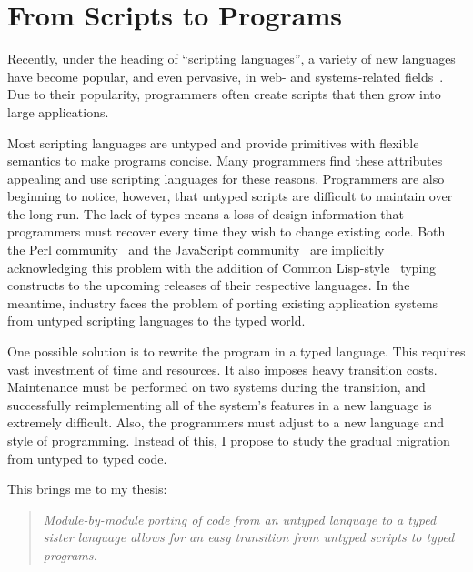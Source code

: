\chapter{From Scripts to Programs}
\label{chap:introduction}

Recently, under the heading of ``scripting languages'', a variety of
new languages have become popular, and even pervasive, in web- and
systems-related fields~\cite{ltm:php,ecma-std,ruby,tcltk,vd:python-ref-man,perl}.  Due to
their popularity, programmers often create scripts that then grow into
large applications.

Most scripting languages are untyped and provide primitives with
flexible semantics to make programs concise.  Many programmers find
these attributes appealing and use scripting languages for these
reasons.  Programmers are also beginning to notice, however, that
untyped scripts are difficult to maintain over the long run. The lack
of types means a loss of design information that programmers must
recover every time they wish to change existing code. Both the Perl
community~\citep{tang} and the JavaScript community~\citep{ecma-wiki,hf:js-ml} are
implicitly acknowledging this problem with the addition of Common
Lisp-style~\citep{cl2} typing constructs to the upcoming releases of
their respective languages.  In the meantime, industry faces the
problem of porting existing application systems from untyped scripting
languages to the typed world.


One possible solution is to rewrite the program in a typed language.
This requires vast investment of time and resources.  It also imposes
heavy transition costs.  Maintenance must be performed on two systems
during the transition, and successfully reimplementing all of the
system's features in 
a new language is extremely difficult.  Also, the programmers must
adjust to a new language and style of programming.  Instead of this,
I propose to study the gradual migration from untyped to typed code.

This brings me to my thesis:

\begin{quote}
{\it Module-by-module porting of code from an untyped
language to a typed sister language allows for an easy transition from
untyped scripts to typed programs.}
\end{quote}


